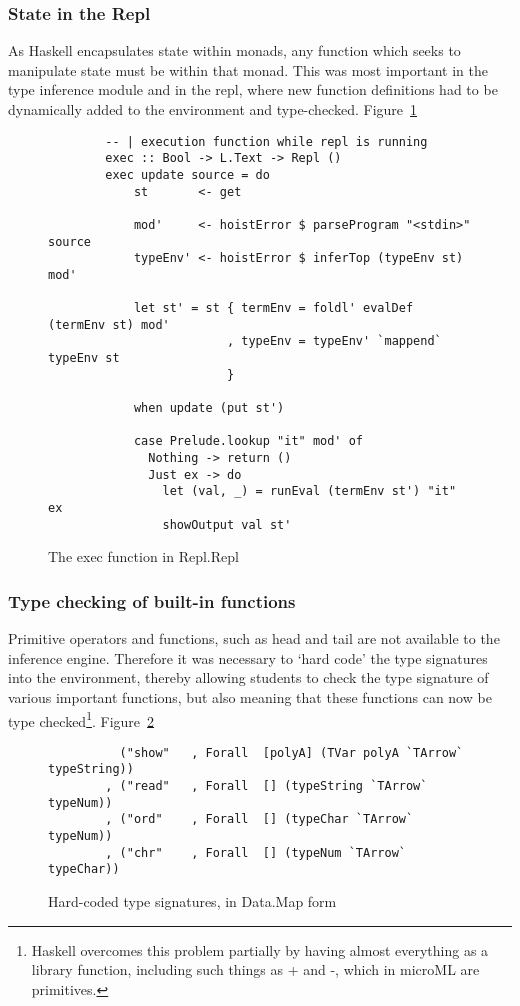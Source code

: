 \subsubsection{State in the Repl}
As Haskell encapsulates state within monads, any function which seeks to manipulate state must be
within that monad. This was most important in the type inference module and in the repl, where new
function definitions had to be dynamically added to the environment and type-checked.
Figure~\ref{fig:exec}

\begin{figure}
    \begin{verbatim}
        -- | execution function while repl is running
        exec :: Bool -> L.Text -> Repl ()
        exec update source = do
            st       <- get

            mod'     <- hoistError $ parseProgram "<stdin>" source
            typeEnv' <- hoistError $ inferTop (typeEnv st) mod'

            let st' = st { termEnv = foldl' evalDef (termEnv st) mod'
                         , typeEnv = typeEnv' `mappend` typeEnv st 
                         }

            when update (put st')

            case Prelude.lookup "it" mod' of
              Nothing -> return ()
              Just ex -> do
                let (val, _) = runEval (termEnv st') "it" ex
                showOutput val st'
    \end{verbatim}
    \caption{The exec function in Repl.Repl}
\label{fig:exec}
\end{figure}

\subsubsection{Type checking of built-in functions}
Primitive operators and functions, such as head and tail are not available to the inference engine.
Therefore it was necessary to `hard code' the type signatures into the environment, thereby allowing
students to check the type signature of various important functions, but also meaning that these
functions can now be type checked\footnote{Haskell overcomes this problem partially by having almost
everything as a library function, including such things as + and -, which in microML are
primitives.}. Figure~\ref{fig:typesigs}

\begin{figure}
    \begin{verbatim}
          ("show"   , Forall  [polyA] (TVar polyA `TArrow` typeString))
        , ("read"   , Forall  [] (typeString `TArrow` typeNum))
        , ("ord"    , Forall  [] (typeChar `TArrow` typeNum))
        , ("chr"    , Forall  [] (typeNum `TArrow` typeChar))
    \end{verbatim}
    \caption{Hard-coded type signatures, in Data.Map form}
\label{fig:typesigs}
\end{figure}

